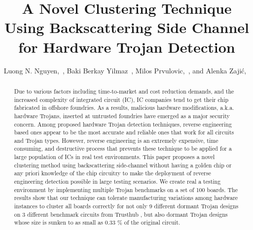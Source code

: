 \documentclass[journal]{IEEEtran}
\begin{document}
\title{A Novel Clustering Technique Using Backscattering Side Channel for Hardware Trojan Detection}
\author{Luong N. Nguyen,~, Baki Berkay Yilmaz~,  Milos Prvulovic,~, and Alenka Zaji\'{c},~
}
\maketitle

\begin{abstract}
Due to various factors including time-to-market and cost reduction demands, and the increased complexity of integrated circuit (IC), IC companies tend to get their chip fabricated in offshore foundries. As a results, malicious hardware modifications, a.k.a. hardware Trojans, inserted at untrusted foundries have emerged as a major security concern. Among proposed hardware Trojan detection techniques, reverse engineering based ones appear to be the most accurate and reliable ones that work for all circuits and Trojan types. However, reverse engineering is an extremely expensive, time consuming, and destructive process that prevents these technique to be applied for a large population of ICs in real test environments. This paper proposes a novel clustering method using backscattering side-channel without having a golden chip or any priori knowledge of the chip circuitry to make the deployment of reverse engineering detection possible in large testing scenarios. We create real a testing environment by implementing multiple Trojan benchmarks on a set of 100 boards. The results show that our technique can tolerate manufacturing variations among hardware instances to cluster all boards correctly for not only 9 different dormant Trojan designs on 3 different benchmark circuits from Trusthub \cite{shakya2017benchmarking}, but also dormant Trojan designs whose size is sunken to as small as 0.33 \% of the original circuit.

\end{abstract}
\end{document}
